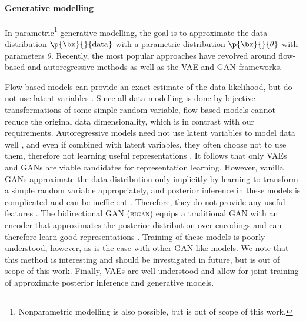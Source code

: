 \paragraph{Generative modelling}
In parametric\footnote{Nonparametric modelling is also possible, but is out of scope of this work.} generative modelling, the goal is to approximate the data distribution $\p{\bx}{}{\mathrm{data}}$ with a parametric distribution $\p{\bx}{}{\theta}$ with parameters $\theta$.
Recently, the most popular approaches have revolved around flow-based and autoregressive methods as well as the \gls{VAE} and \gls{GAN} frameworks.

Flow-based models can provide an exact estimate of the data likelihood, but do not use latent variables \citep{Rezende2015flow,Dinh2016realnvp,Kingma2018glow}.
Since all data modelling is done by bijective transformations of some simple random variable, flow-based models cannot reduce the original data dimensionality, which is in contrast with our requirements.
Autoregressive models need not use latent variables to model data well \citep{Uria2016nade,Oord2016wavenet}, and even if combined with latent variables, they often choose not to use them, therefore not learning useful representations \citep{Gulrajani2016pixelvae}.
It follows that only \gls{VAE}s and \gls{GAN}s are viable candidates for representation learning.
However, vanilla \gls{GAN}s approximate the data distribution only implicitly by learning to transform a simple random variable appropriately, and posterior inference in these models is complicated and can be inefficient \citep{Bojanowski2017gan}.
Therefore, they do not provide any useful features \citep{Radford2016gan,Goodfellow2014generative}.
The bidirectional \gls{GAN} (\textsc{bigan}) equips a traditional \gls{GAN} with an encoder that approximates the posterior distribution over encodings and can therefore learn good representations \citep{Donahue2017bigan, Donahue2019bigbigan}.
Training of these models is poorly understood, however, as is the case with other \gls{GAN}-like models.
We note that this method is interesting and should be investigated in future, but is out of scope of this work.
Finally, \gls{VAE}s are well understood and allow for joint training of approximate posterior inference and generative models.

